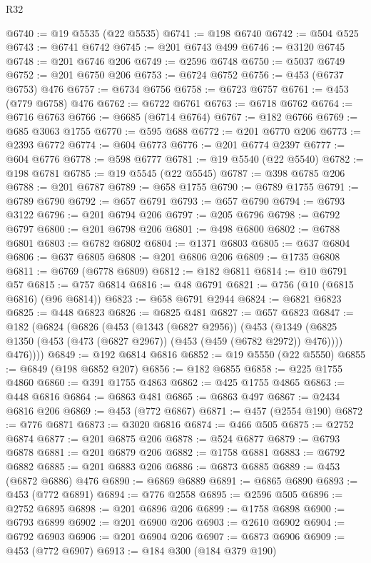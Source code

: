 \begin{lexlean}{R32}
\begin{coremodule}
@6740 := @19 @5535 (@22 @5535)
@6741 := @198 @6740
@6742 := @504 @525
@6743 := @6741 @6742
@6745 := @201 @6743 @499
@6746 := @3120 @6745
@6748 := @201 @6746 @206
@6749 := @2596 @6748
@6750 := @5037 @6749
@6752 := @201 @6750 @206
@6753 := @6724 @6752
@6756 := @453 (@6737 @6753) @476
@6757 := @6734 @6756
@6758 := @6723 @6757
@6761 := @453 (@779 @6758) @476
@6762 := @6722 @6761
@6763 := @6718 @6762
@6764 := @6716 @6763
@6766 := @6685 (@6714 @6764)
@6767 := @182 @6766
@6769 := @685 @3063 @1755
@6770 := @595 @688
@6772 := @201 @6770 @206
@6773 := @2393 @6772
@6774 := @604 @6773
@6776 := @201 @6774 @2397
@6777 := @604 @6776
@6778 := @598 @6777
@6781 := @19 @5540 (@22 @5540)
@6782 := @198 @6781
@6785 := @19 @5545 (@22 @5545)
@6787 := @398 @6785 @206
@6788 := @201 @6787
@6789 := @658 @1755
@6790 := @6789 @1755
@6791 := @6789 @6790
@6792 := @657 @6791
@6793 := @657 @6790
@6794 := @6793 @3122
@6796 := @201 @6794 @206
@6797 := @205 @6796
@6798 := @6792 @6797
@6800 := @201 @6798 @206
@6801 := @498 @6800
@6802 := @6788 @6801
@6803 := @6782 @6802
@6804 := @1371 @6803
@6805 := @637 @6804
@6806 := @637 @6805
@6808 := @201 @6806 @206
@6809 := @1735 @6808
@6811 := @6769 (@6778 @6809)
@6812 := @182 @6811
@6814 := @10 @6791 @57
@6815 := @757 @6814
@6816 := @48 @6791
@6821 := @756 (@10 (@6815 @6816) (@96 @6814))
@6823 := @658 @6791 @2944
@6824 := @6821 @6823
@6825 := @448 @6823
@6826 := @6825 @481
@6827 := @657 @6823
@6847 := @182
    (@6824
      (@6826
        (@453
          (@1343 (@6827 @2956))
          (@453
            (@1349 (@6825 @1350 (@453 (@473 (@6827 @2967)) (@453 (@459 (@6782 @2972)) @476))))
            @476))))
@6849 := @192 @6814 @6816
@6852 := @19 @5550 (@22 @5550)
@6855 := @6849 (@198 @6852 @207)
@6856 := @182 @6855
@6858 := @225 @1755 @4860
@6860 := @391 @1755 @4863
@6862 := @425 @1755 @4865
@6863 := @448 @6816
@6864 := @6863 @481
@6865 := @6863 @497
@6867 := @2434 @6816 @206
@6869 := @453 (@772 @6867)
@6871 := @457 (@2554 @190)
@6872 := @776 @6871
@6873 := @3020 @6816
@6874 := @466 @505
@6875 := @2752 @6874
@6877 := @201 @6875 @206
@6878 := @524 @6877
@6879 := @6793 @6878
@6881 := @201 @6879 @206
@6882 := @1758 @6881
@6883 := @6792 @6882
@6885 := @201 @6883 @206
@6886 := @6873 @6885
@6889 := @453 (@6872 @6886) @476
@6890 := @6869 @6889
@6891 := @6865 @6890
@6893 := @453 (@772 @6891)
@6894 := @776 @2558
@6895 := @2596 @505
@6896 := @2752 @6895
@6898 := @201 @6896 @206
@6899 := @1758 @6898
@6900 := @6793 @6899
@6902 := @201 @6900 @206
@6903 := @2610 @6902
@6904 := @6792 @6903
@6906 := @201 @6904 @206
@6907 := @6873 @6906
@6909 := @453 (@772 @6907)
@6913 := @184 @300 (@184 @379 @190)

\end{coremodule}
\end{lexlean}
